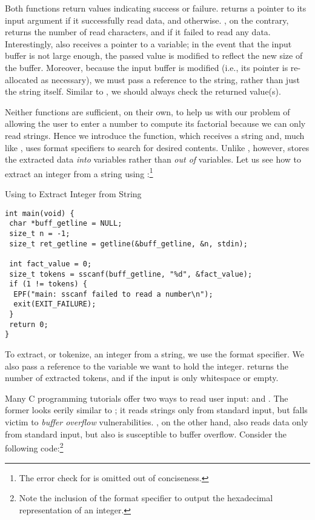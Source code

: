 Both functions return values indicating success or failure.  returns a pointer to its input argument if it successfully read data, and  otherwise. , on the contrary, returns the number of read characters, and  if it failed to read any data. Interestingly,  also receives a pointer to a  variable; in the event that the input buffer is not large enough, the passed  value is modified to reflect the new size of the buffer. Moreover, because the input buffer is modified (i.e., its pointer is re-allocated as necessary), we must pass a reference to the string, rather than just the string itself. Similar to , we should always check the returned value(s).

Neither functions are sufficient, on their own, to help us with our problem of allowing the user to enter a number to compute its factorial because we can only read strings. Hence we introduce the  function, which receives a string and, much like , uses format specifiers to search for desired contents. Unlike , however,  stores the extracted data \textit{into} variables rather than \textit{out of} variables. Let us see how to extract an integer from a string using :\footnote{The error check for  is omitted out of conciseness.}

\begin{cl}[main.c]{Using  to Extract Integer from String}
\begin{lstlisting}[language=MyC]
int main(void) {
 char *buff_getline = NULL;
 size_t n = -1;
 size_t ret_getline = getline(&buff_getline, &n, stdin);

 int fact_value = 0;
 size_t tokens = sscanf(buff_getline, "%d", &fact_value);
 if (1 != tokens) {
  EPF("main: sscanf failed to read a number\n");
  exit(EXIT_FAILURE);
 }
 return 0;
}
\end{lstlisting}
\end{cl}

To extract, or tokenize, an integer from a string, we use the  format specifier. We also pass a reference to the variable we want to hold the integer.  returns the number of extracted tokens, and  if the input is only whitespace or empty.

Many C programming tutorials offer two ways to read user input:  and . The former looks eerily similar to ; it reads strings only from standard input, but falls victim to \textit{buffer overflow} vulnerabilities. , on the other hand, also reads data only from standard input, but also is susceptible to buffer overflow. Consider the following code:\footnote{Note the inclusion of the format specifier  to output the hexadecimal representation of an integer.}

